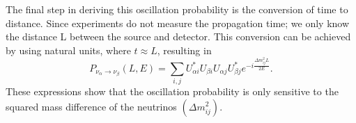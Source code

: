 The final step in deriving this oscillation probability is the conversion of time to distance. Since experiments do not measure the propagation time; we only know the distance L between the source and detector. This conversion can be achieved by using natural units, where $t\approx L$, resulting in
\begin{equation}
    P_{\nu_\alpha\rightarrow\nu_\beta}(L,E)=\sum_{i,j} U^*_{\alpha i} U_{\beta i} U_{\alpha j} U^*_{\beta j} e^{-i\frac{\Delta m^2_{ij}L}{2E}}.
\end{equation}
These expressions show that the oscillation probability is only sensitive to the squared mass difference of the neutrinos $(\Delta m^2_{ij})$.

